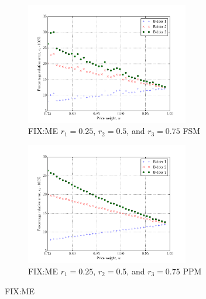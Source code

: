 \begin{figure}[p!]
  \begin{subfigure}[b]{0.5\textwidth}
    \includegraphics[width=2.8in]{Approximation/Figures/compare_3_bidders_025_050_075}
    \caption{FIX:ME $r_1=0.25$, $r_2=0.5$, and $r_3=0.75$ FSM}
    \label{fig:compare_3_bidders_025_050_075_fsm_approximation}
  \end{subfigure}
  \begin{subfigure}[b]{0.5\textwidth}
    \includegraphics[width=2.8in]{Approximation/Figures/compare_3_bidders_025_050_075_ppm}
    \caption{FIX:ME $r_1=0.25$, $r_2=0.5$, and $r_3=0.75$ PPM}
    \label{fig:compare_3_bidders_025_050_075_ppm_approximation}
  \end{subfigure}
  \caption{FIX:ME}
  \label{fig:compare_3_bidders_025_050_075_approximation}


\end{figure}

